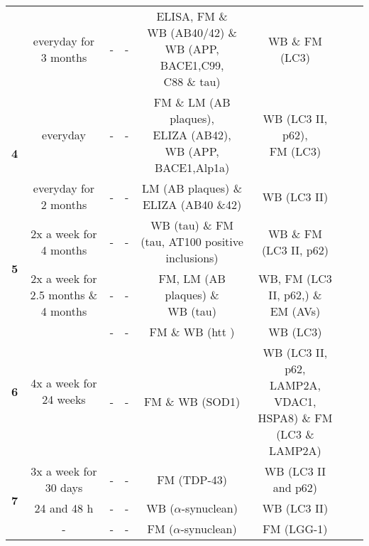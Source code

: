 \begin{landscape}
\begin{table}[p]
\begin{tabular}{cccccccc}
& \makecell{everyday for \\3 months} & - & - & \makecell{ELISA, FM \& \\WB (AB40/42) \& \\WB (APP, BACE1,C99, \\ C88 \& tau)} & WB \& FM (LC3) & \citet{Zhang2011} \\\cmidrule{1-7}
\multirow{2}{*}{\textbf{4}} & everyday & - & - & \makecell{FM \& LM (AB plaques), \\ELIZA (AB42), \\WB (APP, BACE1,Alp1a)} & \makecell{WB (LC3 II, p62), \\FM (LC3)} & \citet{Li2013} \\
& \makecell{everyday for \\2 months} & - & - & \makecell{LM (AB plaques) \& \\ELIZA (AB40 \&42)} & WB (LC3 II) & \citet{Zhang2017} \\\cmidrule{1-7}
\multirow{2}{*}{\textbf{5}} & \makecell{2x a week for \\4 months} & - & - & \makecell{WB (tau) \& FM \\(tau, AT100 positive inclusions)} & WB \& FM (LC3 II, p62) & \citet{Schaeffer2012} \\
& \makecell{2x a week for \\2.5 months \& 4 months} & - & - & \makecell{FM, LM (AB plaques) \& \\ WB (tau)} & \makecell{WB, FM (LC3 II, p62,) \& \\EM (AVs)} & \citet{Rodriguez-Navarro2010} \\\cmidrule{1-7}
\multirow{2}{*}{\textbf{6}} & \multirow{2}{*}{4x a week for 24 weeks} & - & - & FM \& WB (htt ) & WB (LC3) & \citet{Rose2010} \\
& & - & - & FM \& WB (SOD1) & \makecell{WB (LC3 II, p62, \\LAMP2A, VDAC1, \\HSPA8) \& FM (LC3 \& \\LAMP2A)} & \citet{Perera2018} \\\cmidrule{1-7}
\multirow{3}{*}{\textbf{7}} & 3x a week for 30 days & - & - & FM (TDP-43) & WB (LC3 II and p62) & \citet{Wang2012} \\
& 24 and 48 h & - & - & WB ($\alpha$-synuclean) & WB (LC3 II) & \multirow{2}{*}{\citet{Buttner2014}} \\
& - & - & - & FM ($\alpha$-synuclean) & FM (LGG-1) \\
\bottomrule
\end{tabular}
\end{table}
\end{landscape}